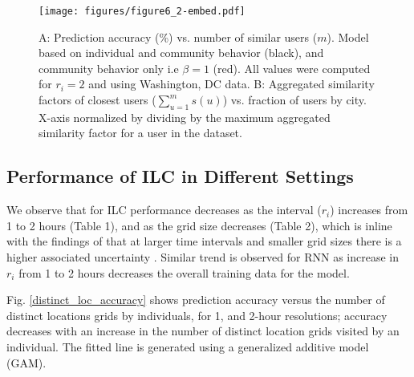 \begin{figure}[t]
\centering
\texttt{[image: figures/figure6\_2-embed.pdf]}
\caption{A: Prediction accuracy (\%) vs. number of similar users ($m$). Model based on individual and community behavior (black), and community behavior only i.e $\beta=1$ (red). All values were computed for $r_i=2$ and using Washington, DC data. B: Aggregated similarity factors of closest users ($\sum_{u=1}^m{s(u)}$) vs. fraction of users by city. X-axis normalized by dividing by the maximum aggregated similarity factor for a user in the dataset.}
\label{smilar_user}
\end{figure}


\subsection{Performance of ILC in Different Settings}
We observe that for ILC performance decreases as the interval ($r_i$) increases from 1 to 2 hours (Table 1), and as the grid size decreases (Table 2), which is inline with the findings of \cite{cuttone2018understanding} that at larger time intervals and smaller grid sizes there is a higher associated uncertainty . Similar trend is observed for RNN as increase in $r_i$ from 1 to 2 hours decreases the overall training data for the model.

Fig. \ref{distinct_loc_accuracy} shows prediction accuracy versus the number of distinct locations grids by individuals, for 1, and 2-hour resolutions; accuracy decreases with an increase in the number of distinct location grids visited by an individual. The fitted line is generated using a generalized additive model (GAM).

